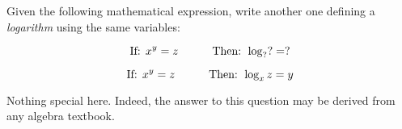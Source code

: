 

Given the following mathematical expression, write another one defining a {\it logarithm} using the same variables:

$$\hbox{If: }x^y = z \hbox{\hskip30pt Then: } \log_{?} ? = ?$$







$$\hbox{If: }x^y = z \hbox{\hskip30pt Then: } \log_{x} z = y$$







Nothing special here.  Indeed, the answer to this question may be derived from any algebra textbook.




